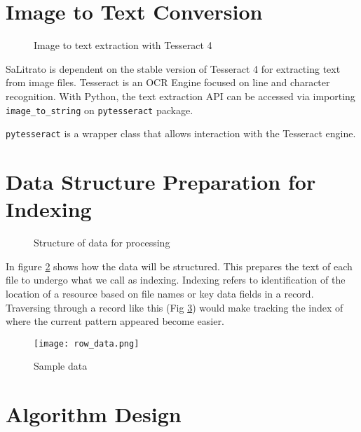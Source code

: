 \section*{Image to Text Conversion}

\begin{figure}[hbt!]
    \center
    \noindent{}
    \caption{Image to text extraction with Tesseract 4}
    \label{fig:ocrapi}
\end{figure}

SaLitrato is dependent on the stable version of Tesseract 4 for extracting text from image files. Tesseract 
is an OCR Engine focused on line and character recognition. With Python, the text extraction
API can be accessed via importing \texttt{image\_to\_string} on \texttt{pytesseract}
package.

\hfill

\noindent
\texttt{pytesseract} is a wrapper class that allows interaction with the Tesseract engine.


\section*{Data Structure Preparation for Indexing}

\begin{figure}[hbt!]
    \center
    \noindent{}
    \caption{Structure of data for processing}
    \label{fig:data_structure1}
\end{figure}

In figure \ref{fig:data_structure1} shows how the data will be structured. This prepares the
text of each file to undergo what we call as indexing. Indexing refers to identification of the
location of a resource based on file names or key data fields in a record. Traversing through a
record like this (Fig \ref{fig:indexing}) would make tracking the index of where the current pattern appeared become easier.

\begin{figure}[hbt!]
   \center
   \noindent\texttt{[image: row\_data.png]}
   \caption{Sample data}
   \label{fig:indexing}
\end{figure}

\section*{Algorithm Design}

